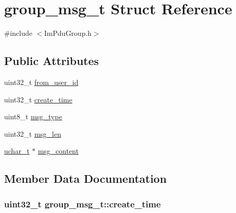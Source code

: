 \hypertarget{structgroup__msg__t}{}\section{group\+\_\+msg\+\_\+t Struct Reference}
\label{structgroup__msg__t}


{\ttfamily \#include $<$Im\+Pdu\+Group.\+h$>$}

\subsection*{Public Attributes}
\begin{DoxyCompactItemize}
\item 
uint32\+\_\+t \hyperlink{structgroup__msg__t_a69258f7d7948f4f5cbfbc0414e9eca4b}{from\+\_\+user\+\_\+id}
\item 
uint32\+\_\+t \hyperlink{structgroup__msg__t_ae2b42149b5aeb66e2ce23898f8e25197}{create\+\_\+time}
\item 
uint8\+\_\+t \hyperlink{structgroup__msg__t_a041f9b8689241e82a0b46242562f8be2}{msg\+\_\+type}
\item 
uint32\+\_\+t \hyperlink{structgroup__msg__t_ab87b25244a68a26908ff87dc0a2bb949}{msg\+\_\+len}
\item 
\hyperlink{base_2ostype_8h_a124ea0f8f4a23a0a286b5582137f0b8d}{uchar\+\_\+t} $\ast$ \hyperlink{structgroup__msg__t_af27f4b75488374434e977f79b48d044c}{msg\+\_\+content}
\end{DoxyCompactItemize}


\subsection{Member Data Documentation}
\hypertarget{structgroup__msg__t_ae2b42149b5aeb66e2ce23898f8e25197}{}
\subsubsection[{create\+\_\+time}]{\setlength{\rightskip}{0pt plus 5cm}uint32\+\_\+t group\+\_\+msg\+\_\+t\+::create\+\_\+time}\label{structgroup__msg__t_ae2b42149b5aeb66e2ce23898f8e25197}
\hypertarget{structgroup__msg__t_a69258f7d7948f4f5cbfbc0414e9eca4b}{}
